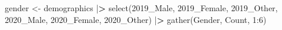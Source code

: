 \documentclass[
]{article}
\newenvironment{Shaded}{\begin{snugshade}}{\end{snugshade}}
\newcommand{\AttributeTok}[1]{\textcolor[rgb]{0.77,0.63,0.00}{#1}}
\newcommand{\DecValTok}[1]{\textcolor[rgb]{0.00,0.00,0.81}{#1}}
\newcommand{\ErrorTok}[1]{\textcolor[rgb]{0.64,0.00,0.00}{\textbf{#1}}}
\newcommand{\FunctionTok}[1]{\textcolor[rgb]{0.00,0.00,0.00}{#1}}
\newcommand{\NormalTok}[1]{#1}
\newcommand{\OtherTok}[1]{\textcolor[rgb]{0.56,0.35,0.01}{#1}}
\newcommand{\SpecialCharTok}[1]{\textcolor[rgb]{0.00,0.00,0.00}{#1}}
\newcommand{\StringTok}[1]{\textcolor[rgb]{0.31,0.60,0.02}{#1}}
\begin{document}
\begin{Shaded}
\begin{Highlighting}[]
\NormalTok{gender }\OtherTok{\textless{}{-}} 
\NormalTok{  demographics }\SpecialCharTok{|}\ErrorTok{\textgreater{}}
  \FunctionTok{select}\NormalTok{(}\StringTok{\textasciigrave{}}\AttributeTok{2019\_Male}\StringTok{\textasciigrave{}}\NormalTok{, }\StringTok{\textasciigrave{}}\AttributeTok{2019\_Female}\StringTok{\textasciigrave{}}\NormalTok{, }\StringTok{\textasciigrave{}}\AttributeTok{2019\_Other}\StringTok{\textasciigrave{}}\NormalTok{, }\StringTok{\textasciigrave{}}\AttributeTok{2020\_Male}\StringTok{\textasciigrave{}}\NormalTok{, }\StringTok{\textasciigrave{}}\AttributeTok{2020\_Female}\StringTok{\textasciigrave{}}\NormalTok{, }\StringTok{\textasciigrave{}}\AttributeTok{2020\_Other}\StringTok{\textasciigrave{}}\NormalTok{) }\SpecialCharTok{|}\ErrorTok{\textgreater{}}
  \FunctionTok{gather}\NormalTok{(Gender, Count, }\DecValTok{1}\SpecialCharTok{:}\DecValTok{6}\NormalTok{)}


\end{Highlighting}
\end{Shaded}
\end{document}
